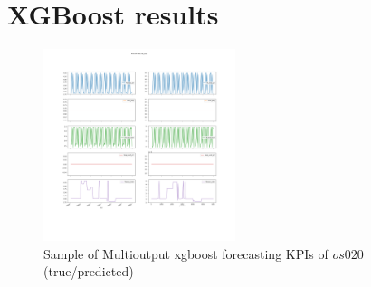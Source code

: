 \documentclass[acmsmall, screen, nonacm]{acmart}
\begin{document}
\section{XGBoost results}\label{sec:appendix_xgboost}
\begin{figure}[h!]
  \centering
  \includegraphics[width=0.5\textwidth]{images/multioutput_xgboost_os020.png}
  \caption{Sample of Multioutput xgboost forecasting KPIs of $os020$ (true/predicted)}
  \label{fig:xgboost}
\end{figure}
\end{document}
